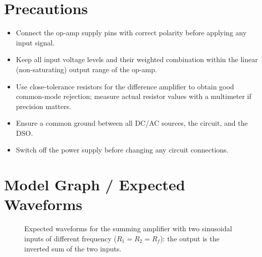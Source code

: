 \section{Precautions}
\begin{itemize}
	\item Connect the op-amp supply pins with correct polarity before applying any input signal.
	\item Keep all input voltage levels and their weighted combination within the linear (non-saturating) output range of the op-amp.
	\item Use close-tolerance resistors for the difference amplifier to obtain good common-mode rejection; measure actual resistor values with a multimeter if precision matters.
	\item Ensure a common ground between all DC/AC sources, the circuit, and the DSO.
	\item Switch off the power supply before changing any circuit connections.
\end{itemize}

\section{Model Graph / Expected Waveforms}

\begin{figure}[h!]
	\centering
	\caption{Expected waveforms for the summing amplifier with two sinusoidal inputs of different frequency ($R_1=R_2=R_f$): the output is the inverted sum of the two inputs.}
	\label{fig:wave_adder}
\end{figure}

